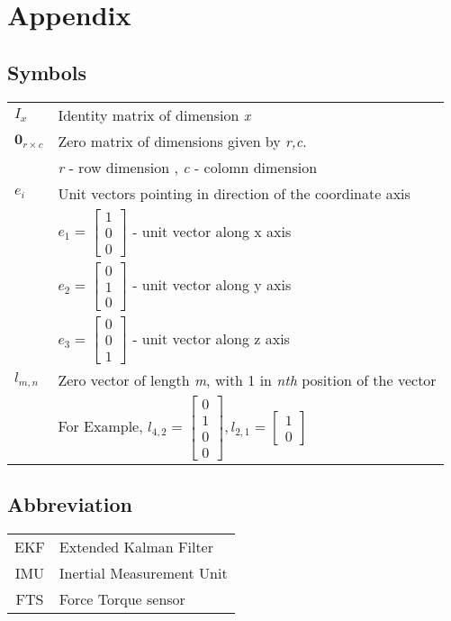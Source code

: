 \chapter{Appendix}
\section{Symbols}
\label{sec:symbols}
\begin{tabular}{p{2cm} l}
$I_{x}$ & Identity matrix of dimension \emph{x} \\
$\textbf{0}_{r \times c}$ & Zero matrix of dimensions given by \emph{r,c}. \\
						  & \emph{r} - row dimension , \emph{c} - colomn dimension \\
$e_i$ 			& Unit vectors pointing in direction of the coordinate axis  \\
				& $e_1 = \begin{bmatrix} 1 \\ 0 \\ 0 \end{bmatrix} $ - unit vector along x axis \\						& $e_2 = \begin{bmatrix} 0 \\ 1 \\ 0 \end{bmatrix} $ - unit vector along y axis \\						& $e_3 = \begin{bmatrix} 0 \\ 0 \\ 1 \end{bmatrix} $ - unit vector along z axis \\	
$l_{m,n}$    	& Zero vector of length \emph{m}, with 1 in \emph{nth} position of the vector \\
			    & For Example, $l_{4,2} = \begin{bmatrix} 0 \\ 1 \\ 0 \\ 0 \end{bmatrix}, l_{2,1} = 						\begin{bmatrix} 1 \\ 0 \end{bmatrix} $ \\		
\end{tabular}

\section{Abbreviation}
\begin{tabular}{c l}
EKF & Extended Kalman Filter \\
IMU & Inertial Measurement Unit \\
FTS & Force Torque sensor \\
\end{tabular}

